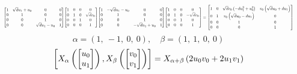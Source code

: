 \documentclass[11pt]{article}
\theoremstyle{definition}
\begin{document}
\[
\scaletoalign{\textwidth}{{\left[\begin{matrix}1 & \sqrt{d} u_{1} + u_{0} & 0 & 0\\0 & 1 & 0 & 0\\0 & 0 & 1 & 0\\0 & 0 & \sqrt{d} u_{1} - u_{0} & 1\end{matrix}\right]} {\left[\begin{matrix}1 & 0 & 0 & 0\\0 & 1 & 0 & \sqrt{d} v_{0}\\0 & 0 & 1 & 0\\0 & 0 & 0 & 1\end{matrix}\right]} {\left[\begin{matrix}1 & - \sqrt{d} u_{1} - u_{0} & 0 & 0\\0 & 1 & 0 & 0\\0 & 0 & 1 & 0\\0 & 0 & - \sqrt{d} u_{1} + u_{0} & 1\end{matrix}\right]} {\left[\begin{matrix}1 & 0 & 0 & 0\\0 & 1 & 0 & - \sqrt{d} v_{0}\\0 & 0 & 1 & 0\\0 & 0 & 0 & 1\end{matrix}\right]} = {\left[\begin{matrix}1 & 0 & \sqrt{d} v_{0} \left(- d u_{1}^{2} + u_{0}^{2}\right) & v_{0} \left(\sqrt{d} u_{0} + d u_{1}\right)\\0 & 1 & v_{0} \left(\sqrt{d} u_{0} - d u_{1}\right) & 0\\0 & 0 & 1 & 0\\0 & 0 & 0 & 1\end{matrix}\right]}}
\]
\[
\alpha = \left( 1, \  -1, \  0, \  0\right), \quad \beta = \left( 1, \  1, \  0, \  0\right)
\]
\[
\scaletoalign{\textwidth}{\left[ X_{\alpha}\left(\left[\begin{matrix}u_{0}\\u_{1}\end{matrix}\right]\right), X_{\beta}\left(\left[\begin{matrix}v_{0}\\v_{1}\end{matrix}\right]\right) \right] = X_{\alpha + \beta}\left(2 u_{0} v_{0} + 2 u_{1} v_{1}\right)}
\]
\end{document}
